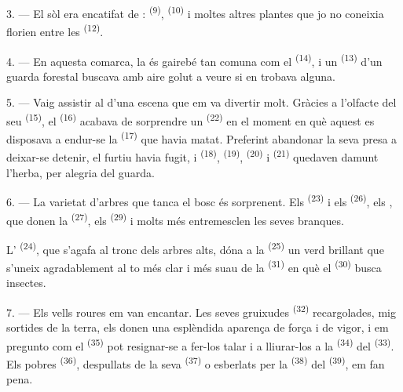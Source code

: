 3. --- El sòl era encatifat de : 
\textsuperscript{(9)},  \textsuperscript{(10)} i moltes
altres plantes que jo no coneixia florien entre les 
\textsuperscript{(12)}.

4. --- En aquesta comarca, la  és gairebé tan comuna com el
 \textsuperscript{(14)}, i un 
\textsuperscript{(13)} d'un guarda forestal buscava amb aire golut a veure si en
trobava alguna.

\VUsaut{3.0mm}
\VUsaut{3.0mm}

5. --- Vaig assistir al  d'una escena que em va divertir molt.
Gràcies a l'olfacte del seu  \textsuperscript{(15)}, el
 \textsuperscript{(16)} acabava de sorprendre un
 \textsuperscript{(22)} en el moment en què aquest es
disposava a endur-se la  \textsuperscript{(17)} que havia matat.
Preferint abandonar la seva presa a deixar-se detenir, el furtiu havia fugit, i
 \textsuperscript{(18)}, 
\textsuperscript{(19)},  \textsuperscript{(20)} i
 \textsuperscript{(21)} quedaven damunt l'herba, per alegria del
guarda.

6. --- La varietat d'arbres que tanca el bosc és sorprenent. Els 
\textsuperscript{(23)} i els  \textsuperscript{(26)}, els
, que donen la  \textsuperscript{(27)}, els
 \textsuperscript{(29)} i molts més entremesclen les seves
branques.

L' \textsuperscript{(24)}, que s'agafa al tronc dels arbres alts, dóna
a la  \textsuperscript{(25)} un verd brillant que s'uneix
agradablement al to més clar i més suau de la 
\textsuperscript{(31)} en què el  \textsuperscript{(30)} busca
insectes.

\VUsaut{3.0mm}
\VUsaut{3.0mm}

7. --- Els vells roures em van encantar. Les seves gruixudes 
\textsuperscript{(32)} recargolades, mig sortides de la terra, els donen una
esplèndida aparença de força i de vigor, i em pregunto com el
 \textsuperscript{(35)} pot resignar-se a fer-los talar i a
lliurar-los a la  \textsuperscript{(34)} del 
\textsuperscript{(33)}. Els pobres  \textsuperscript{(36)},
despullats de la seva  \textsuperscript{(37)} o esberlats per la
 \textsuperscript{(38)} del 
\textsuperscript{(39)}, em fan pena.

